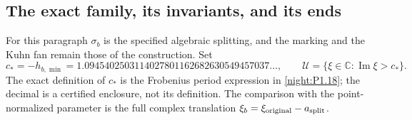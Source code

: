 \subsection{The exact family, its invariants, and its ends}
For this paragraph $\sigma_b$ is the specified algebraic splitting,
and the marking and the Kuhn fan remain those of the construction.
Set
\[
 c_*=-h_{b,\min}=1.0945402503114027801162682630549457037\ldots,
 \qquad \mathcal U=\{\xi\in\mathbb C:\operatorname{Im}\xi>c_*\}.
\]
The exact definition of $c_*$ is the Frobenius period expression in
\cref{night:P1.18}; the decimal is a certified enclosure, not its
definition.  The comparison with the point-normalized parameter is
the full complex translation $\xi_b=\xi_{\rm original}-a_{\rm split}$.

\RungOne
